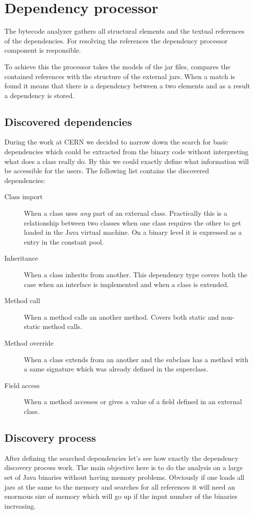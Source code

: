 \section{Dependency processor}
The bytecode analyzer gathers all structural elements and the textual references
of the dependencies. For resolving the references the dependency processor
component is responsible.

To achieve this the processor takes the models of the jar files, compares the
contained references with the structure of the external jars. When a match is
found it means that there is a dependency between a two elements and as a result
a dependency is stored.

\subsection{Discovered dependencies}
During the work at CERN we decided to narrow down the search for basic
dependencies which could be extracted from the binary code without interpreting
what does a class really do. By this we could exactly define what information
will be accessible for the users. The following list contains the discovered
dependencies:
\begin{description}
\item[Class import] When a class uses \emph{any} part of an external class. 
Practically this is a relationship between two classes when one class requires
the other to get loaded in the Java virtual machine. On a binary level it is 
expressed as a  entry in the constant pool.  
\item[Inheritance] When a class inherits from another. This dependency type 
covers both the case when an interface is implemented and when a class is 
extended. 
\item[Method call] When a method calls an another method. Covers both static 
and non-static method calls.
\item[Method override] When a class extends from an another and the subclass 
has a method with a same signature which was already defined in the superclass.  
\item[Field access] When a method accesses or gives a value of a field defined 
in an external class.
\end{description}


\subsection{Discovery process}
After defining the searched dependencies let's see how exactly the dependency
discovery process work. The main objective here is to do the analysis on a large
set of Java binaries without having memory problems. Obviously if one loads all
jars at the same to the memory and searches for all references it will need an
enormous size of memory which will go up if the input number of the binaries
increasing.

